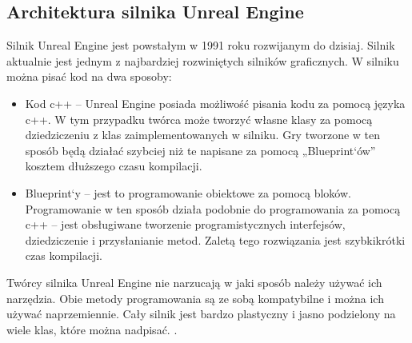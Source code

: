 \documentclass[12pt,twoside]{article}
\begin{document}
\clearpage
\subsection{Architektura silnika Unreal Engine}
Silnik Unreal Engine jest powstałym w 1991 roku rozwijanym do dzisiaj. Silnik
aktualnie jest jednym z najbardziej rozwiniętych silników graficznych. W silniku
można pisać kod na dwa sposoby: 
\begin{itemize}
\item Kod c++ -- Unreal Engine posiada możliwość pisania kodu za pomocą języka
c++. W tym przypadku twórca może tworzyć własne klasy za pomocą dziedziczeniu z
klas zaimplementowanych w silniku. Gry tworzone w ten sposób będą działać
szybciej niż te napisane za pomocą „Blueprint`ów” kosztem dłuższego czasu kompilacji. 
\item Blueprint`y -- jest to programowanie obiektowe za pomocą bloków.
Programowanie w ten sposób działa podobnie do programowania za pomocą c++ -- jest
obsługiwane tworzenie programistycznych interfejsów, dziedziczenie i
przysłanianie metod. Zaletą tego rozwiązania jest szybkikrótki czas kompilacji.
\end{itemize}

Twórcy silnika Unreal Engine nie narzucają w jaki sposób należy używać ich
narzędzia. Obie metody programowania są ze sobą kompatybilne i można ich używać
naprzemiennie. Cały silnik jest bardzo plastyczny i jasno podzielony na wiele
klas, które można nadpisać. \cite{UnrealEngineArchitecture}. 
\end{document}
